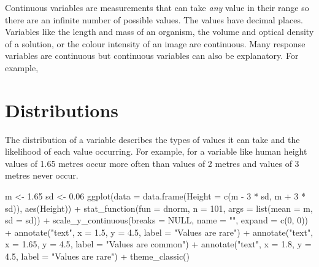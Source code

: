 \documentclass[
  letterpaper,
  DIV=11,
  numbers=noendperiod]{scrreprt}
\newenvironment{Shaded}{\begin{snugshade}}{\end{snugshade}}
\newcommand{\AttributeTok}[1]{\textcolor[rgb]{0.40,0.45,0.13}{#1}}
\newcommand{\ConstantTok}[1]{\textcolor[rgb]{0.56,0.35,0.01}{#1}}
\newcommand{\DecValTok}[1]{\textcolor[rgb]{0.68,0.00,0.00}{#1}}
\newcommand{\FloatTok}[1]{\textcolor[rgb]{0.68,0.00,0.00}{#1}}
\newcommand{\FunctionTok}[1]{\textcolor[rgb]{0.28,0.35,0.67}{#1}}
\newcommand{\NormalTok}[1]{\textcolor[rgb]{0.00,0.23,0.31}{#1}}
\newcommand{\OtherTok}[1]{\textcolor[rgb]{0.00,0.23,0.31}{#1}}
\newcommand{\SpecialCharTok}[1]{\textcolor[rgb]{0.37,0.37,0.37}{#1}}
\newcommand{\StringTok}[1]{\textcolor[rgb]{0.13,0.47,0.30}{#1}}
\begin{document}
Continuous variables are measurements that can take \emph{any} value in
their range so there are an infinite number of possible values. The
values have decimal places. Variables like the length and mass of an
organism, the volume and optical density of a solution, or the colour
intensity of an image are continuous. Many response variables are
continuous but continuous variables can also be explanatory. For
example,

\hypertarget{distributions}{%
\section{Distributions}\label{distributions}}

The distribution of a variable describes the types of values it can take
and the likelihood of each value occurring. For example, for a variable
like human height values of 1.65 metres occur more often than values of
2 metres and values of 3 metres never occur.

\begin{Shaded}
\begin{Highlighting}[]
\NormalTok{m }\OtherTok{\textless{}{-}} \FloatTok{1.65}
\NormalTok{sd }\OtherTok{\textless{}{-}} \FloatTok{0.06}
\FunctionTok{ggplot}\NormalTok{(}\AttributeTok{data =} \FunctionTok{data.frame}\NormalTok{(}\AttributeTok{Height =} \FunctionTok{c}\NormalTok{(m }\SpecialCharTok{{-}} \DecValTok{3} \SpecialCharTok{*}\NormalTok{ sd, m }\SpecialCharTok{+} \DecValTok{3} \SpecialCharTok{*}\NormalTok{ sd)), }\FunctionTok{aes}\NormalTok{(Height)) }\SpecialCharTok{+}
  \FunctionTok{stat\_function}\NormalTok{(}\AttributeTok{fun =}\NormalTok{ dnorm, }\AttributeTok{n =} \DecValTok{101}\NormalTok{, }
                \AttributeTok{args =} \FunctionTok{list}\NormalTok{(}\AttributeTok{mean =}\NormalTok{ m, }\AttributeTok{sd =}\NormalTok{ sd)) }\SpecialCharTok{+}
  \FunctionTok{scale\_y\_continuous}\NormalTok{(}\AttributeTok{breaks =} \ConstantTok{NULL}\NormalTok{, }\AttributeTok{name =} \StringTok{""}\NormalTok{,}
                     \AttributeTok{expand =} \FunctionTok{c}\NormalTok{(}\DecValTok{0}\NormalTok{, }\DecValTok{0}\NormalTok{)) }\SpecialCharTok{+}
  \FunctionTok{annotate}\NormalTok{(}\StringTok{"text"}\NormalTok{, }\AttributeTok{x =} \FloatTok{1.5}\NormalTok{, }\AttributeTok{y =} \FloatTok{4.5}\NormalTok{,}
           \AttributeTok{label =} \StringTok{"Values are rare"}\NormalTok{) }\SpecialCharTok{+}
    \FunctionTok{annotate}\NormalTok{(}\StringTok{"text"}\NormalTok{, }\AttributeTok{x =} \FloatTok{1.65}\NormalTok{, }\AttributeTok{y =} \FloatTok{4.5}\NormalTok{,}
           \AttributeTok{label =} \StringTok{"Values are common"}\NormalTok{) }\SpecialCharTok{+}
    \FunctionTok{annotate}\NormalTok{(}\StringTok{"text"}\NormalTok{, }\AttributeTok{x =} \FloatTok{1.8}\NormalTok{, }\AttributeTok{y =} \FloatTok{4.5}\NormalTok{,}
           \AttributeTok{label =} \StringTok{"Values are rare"}\NormalTok{) }\SpecialCharTok{+}
  \FunctionTok{theme\_classic}\NormalTok{()}
\end{Highlighting}
\end{Shaded}
\end{document}

